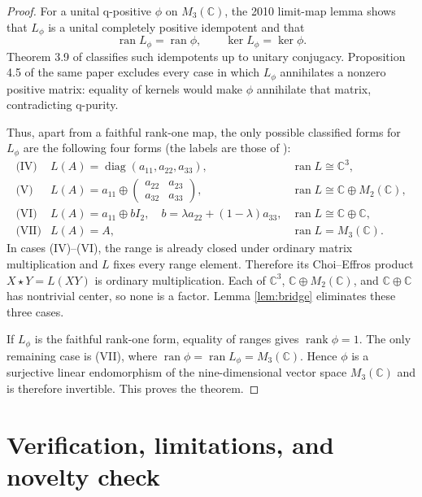 \documentclass[11pt]{article}
\newcommand{\C}{\mathbb C}
\newcommand{\ran}{\operatorname{ran}}
\newcommand{\rank}{\operatorname{rank}}
\begin{document}
\begin{proof}
For a unital q-positive $\phi$ on $M_3(\C)$, the 2010 limit-map lemma shows
that $L_\phi$ is a unital completely positive idempotent and that
\[
  \ran L_\phi=\ran\phi,
  \qquad
  \ker L_\phi=\ker\phi.
\]
Theorem 3.9 of \cite{Jankowski2010} classifies such idempotents up to unitary
conjugacy.  Proposition 4.5 of the same paper excludes every case in which
$L_\phi$ annihilates a nonzero positive matrix: equality of kernels would
make $\phi$ annihilate that matrix, contradicting q-purity.

Thus, apart from a faithful rank-one map, the only possible classified forms
for $L_\phi$ are the following four forms (the labels are those of
\cite{Jankowski2010}):
\[
\begin{array}{ccl}
\text{(IV)}&L(A)=\operatorname{diag}(a_{11},a_{22},a_{33}),
  &\ran L\cong\C^3,\\[2pt]
\text{(V)}&L(A)=a_{11}\oplus
  \begin{pmatrix}a_{22}&a_{23}\\a_{32}&a_{33}\end{pmatrix},
  &\ran L\cong\C\oplus M_2(\C),\\[7pt]
\text{(VI)}&L(A)=a_{11}\oplus bI_2,
  \quad b=\lambda a_{22}+(1-\lambda)a_{33},
  &\ran L\cong\C\oplus\C,\\[2pt]
\text{(VII)}&L(A)=A,
  &\ran L=M_3(\C).
\end{array}
\]
In cases (IV)--(VI), the range is already closed under ordinary matrix
multiplication and $L$ fixes every range element.  Therefore its
Choi--Effros product $X\star Y=L(XY)$ is ordinary multiplication.  Each of
$\C^3$, $\C\oplus M_2(\C)$, and $\C\oplus\C$ has nontrivial center, so none
is a factor.  Lemma \ref{lem:bridge} eliminates these three cases.

If $L_\phi$ is the faithful rank-one form, equality of ranges gives
$\rank\phi=1$.  The only remaining case is (VII), where
$\ran\phi=\ran L_\phi=M_3(\C)$.  Hence $\phi$ is a surjective linear
endomorphism of the nine-dimensional vector space $M_3(\C)$ and is therefore
invertible.  This proves the theorem.
\end{proof}

\section{Verification, limitations, and novelty check}
\end{document}
